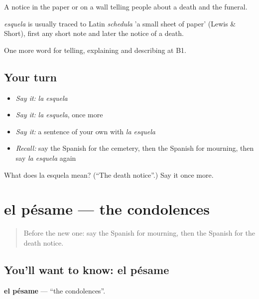 A notice in the paper or on a wall telling people about a death and the funeral.

\begin{cousinweb}
\emph{esquela} is usually traced to Latin \emph{schedula} 'a small sheet of paper' (Lewis \& Short), first any short note and later the notice of a death.
\end{cousinweb}

\begin{grammarlens}[title={What you've built}]
One more word for telling, explaining and describing at B1.
\end{grammarlens}

\subsection*{Your turn}
\begin{itemize}
\raggedright
  \item \emph{Say it:} \emph{la esquela}
  \item \emph{Say it:} \emph{la esquela}, once more
  \item \emph{Say it:} a sentence of your own with \emph{la esquela}
  \item \emph{Recall:} say the Spanish for the cemetery, then the Spanish for mourning, then say \emph{la esquela} again
\end{itemize}

\begin{tcolorbox}[breakable,colback=teal!4,colframe=teal!35!black,title={Before you move on}]
What does la esquela mean? (\textquotedblleft{}The death notice\textquotedblright{}.) Say it once more.
\end{tcolorbox}
\section[el pésame]{el pésame — the condolences}

\label{lesson:ES-C557-pesame}



\begin{quote}
Before the new one: say the Spanish for mourning, then the Spanish for the death notice.
\end{quote}

\subsection*{You'll want to know: el pésame}
\textbf{el pésame} — \textquotedblleft{}the condolences\textquotedblright{}.

